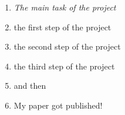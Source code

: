 \begin{enumerate}
    \item \textit{The main task of the project}
    \item the first step of the project
    \item the second step of the project
    \item the third step of the project
    \item and then
    \item My paper got published!

\end{enumerate}